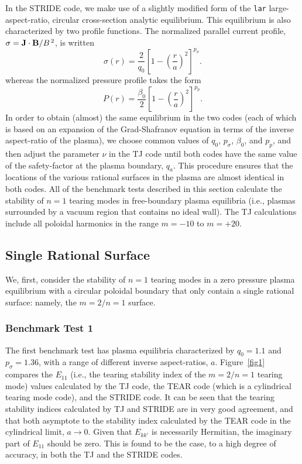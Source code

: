 \documentclass[12pt,prb,aps]{revtex4-1}
\begin{document}
In the  STRIDE code, we make use of a slightly modified form of the \verb|lar| 
large-aspect-ratio, circular cross-section analytic equilibrium. This equilibrium is also characterized by two profile functions. 
The 
 normalized parallel current profile, $\sigma={\bf J}\cdot{\bf B}/B^{\,2}$,  is written
\begin{equation}
\sigma(r) = \frac{2}{q_0}\left[1-\left(\frac{r}{a}\right)^2\right]^{p_\sigma}.
\end{equation}
whereas the  normalized pressure profile takes the form
\begin{equation}
P(r)= \frac{\beta_0}{2}\left[1-\left(\frac{r}{a}\right)^2\right]^{p_p}.
\end{equation}
In order to obtain (almost) the same equilibrium in the two codes (each of which is based on an expansion of the Grad-Shafranov equation in terms of the inverse aspect-ratio of the plasma), we choose common values of $q_0$, $p_\sigma$, $\beta_0$, and $p_p$, and then
adjust the parameter $\nu$ in the TJ code until both codes have the same value of the safety-factor at the plasma boundary, $q_a$. This procedure ensures that the locations of the various rational surfaces in the plasma are
almost identical in both codes. All of the benchmark tests  described in this section calculate the stability of $n=1$ tearing modes  in free-boundary plasma equilibria (i.e., plasmas surrounded by a vacuum region that contains no ideal wall). The TJ calculations include all poloidal harmonics in the range $m=-10$ to $m=+20$. 

\subsection{Single Rational Surface}
We, first,  consider the stability of $n=1$ tearing modes 
in a zero pressure plasma equilibrium with a circular poloidal boundary that only contain a single rational surface: namely, the $m=2/n=1$ surface. 

\subsubsection{Benchmark Test 1}
The first benchmark  test has plasma equilibria characterized by $q_0=1.1$ and $p_\sigma=1.36$, with a range of different inverse aspect-ratios, $a$. 
Figure~\ref{fig1} compares the $E_{11}$ (i.e.,
the tearing stability index of the  $m=2/n=1$ tearing mode) values calculated by the TJ code,\cite{tj} the TEAR code (which is a cylindrical tearing mode code), and
the STRIDE code. It can be seen that the tearing stability indices calculated by  TJ and STRIDE are in very good agreement, and that both asymptote to the stability index calculated by the TEAR code
in the cylindrical limit, $a\rightarrow 0$. Given that  $E_{kk'}$ is necessarily Hermitian,\cite{tj} the imaginary part of $E_{11}$ should be zero. This is found to be the case, to a high
degree of accuracy, in both the TJ and the STRIDE codes. 
\end{document}
